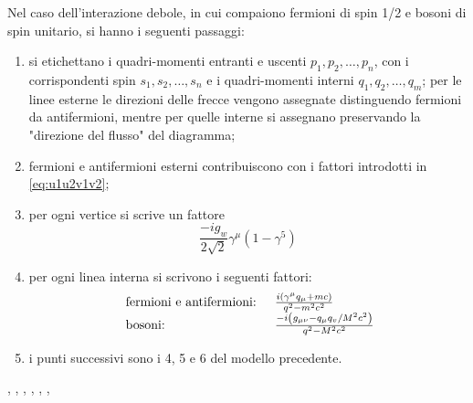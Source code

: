 \documentclass{subnucbo}
\begin{document}
Nel caso dell'interazione debole, in cui compaiono fermioni di spin 1/2 e bosoni di spin unitario, si hanno i seguenti passaggi:
\begin{enumerate}
        \item si etichettano i quadri-momenti entranti e uscenti $p_{1}, p_{2}, \ldots, p_{n}$, con i corrispondenti spin $s_{1}, s_{2}, \ldots, s_{n}$ e i quadri-momenti interni $q_{1}, q_{2}, \ldots, q_{m}$; per le linee esterne le direzioni delle frecce vengono assegnate distinguendo fermioni da antifermioni, mentre per quelle interne si assegnano preservando la "direzione del flusso" del diagramma;
        \item fermioni e antifermioni esterni contribuiscono con i fattori introdotti in \ref{eq:u1u2v1v2};
        \item per ogni vertice si scrive un fattore
                \begin{equation}
                        \frac { - i g _ { w } } { 2 \sqrt { 2 } } \gamma ^ { \mu } \left( 1 - \gamma ^ { 5 } \right)
                \end{equation}
        \item per ogni linea interna si scrivono i seguenti fattori:
                \begin{equation}
                        \begin{array} { l l } { \text { fermioni e antifermioni: } } & { \frac { i \left( \gamma ^ { \mu } q _ { \mu } + m c \right) } { q ^ { 2 } - m ^ { 2 } c ^ { 2 } } } \\ { \text { bosoni: } } & { \frac{- i \left( g _ { \mu \nu } - q _ { \mu } q _ { v } / M ^ { 2 } c ^ { 2 } \right)}{ q ^ { 2 } - M ^ { 2 } c ^ { 2 }  }   }\\ \end{array}
                \end{equation}
        \item i punti successivi sono i 4, 5 e 6 del modello precedente.
\end{enumerate}


\begin{thebibliography}{0}
                ,
                ,
                ,
                ,
                ,
                ,
\end{thebibliography}
\end{document}
